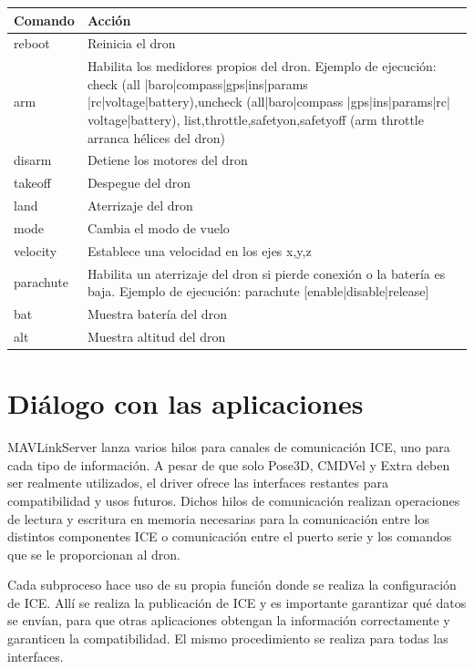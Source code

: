 \begin{center}
  \label{comandos}
  \begin{tabular}{ | l | p{10cm} |}
  \hline
  \textbf{Comando} & \textbf{Acción} \\ \hline
  reboot& Reinicia el dron\\ \hline
  arm & Habilita los medidores propios del dron. Ejemplo de ejecución: check (all |baro|compass|gps|ins|params |rc|voltage|battery),uncheck (all|baro|compass |gps|ins|params|rc| voltage|battery), list,throttle,safetyon,safetyoff (arm throttle arranca hélices del dron)\\ \hline
  disarm& Detiene los motores del dron \\ \hline
  takeoff& Despegue del dron\\ \hline
  land&Aterrizaje del dron \\ \hline
  mode& Cambia el modo de vuelo\\ \hline
  velocity& Establece una velocidad en los ejes x,y,z\\ \hline
  parachute& Habilita un aterrizaje del dron si pierde conexión o la batería es baja. Ejemplo de ejecución: parachute [enable|disable|release]\\ \hline
  bat& Muestra batería del dron\\ \hline
  alt& Muestra altitud del dron\\ \hline
  \end{tabular}
\end{center}


\section{Diálogo con las aplicaciones}

MAVLinkServer lanza varios hilos para canales de comunicación ICE, uno para cada tipo de información. A pesar de que solo Pose3D, CMDVel y Extra deben ser realmente utilizados, el driver ofrece las interfaces restantes para compatibilidad y usos futuros. Dichos hilos de comunicación realizan operaciones de lectura y escritura en memoria necesarias para la comunicación entre los distintos componentes ICE o comunicación entre el puerto serie y los comandos que se le proporcionan al dron.

Cada subproceso hace uso de su propia función donde se realiza la configuración de ICE.
Allí se realiza la publicación de ICE y es importante garantizar qué datos se envían, para que otras aplicaciones obtengan la información correctamente y garanticen la compatibilidad.
El mismo procedimiento se realiza para todas las interfaces.


